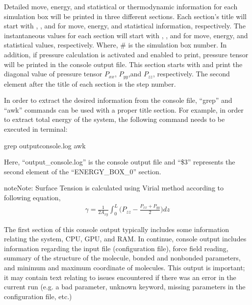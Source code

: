 \documentclass[letterpaper,10pt,english]{sphinxmanual}
\begin{document}
\sphinxAtStartPar
Detailed move, energy, and statistical or thermodynamic information for each simulation box will be printed in
three different sections. Each section’s title will start with , , and  for move,
energy, and statistical information, respectively. The instantaneous values for each section will start with
, , and  for move, energy, and statistical values, respectively. Where, \# is the
simulation box number. In addition, if pressure calculation is activated and enabled to print, pressure tensor
will be printed in the console output file. This section starts with  and print the diagonal value of
pressure tensor \(P_{xx}\), \(P_{yy}\),and \(P_{zz}\), respectively. The second element after the
title of each section is the step number.

\sphinxAtStartPar
In order to extract the desired information from the console file, “grep” and “awk” commands can be used with
a proper title section. For example, in order to extract total energy of the system, the following command needs
to be executed in terminal:

\begin{sphinxVerbatim}[commandchars=\\\{\}]
\PYGZdl{} grep  output\PYGZus{}console.log  awk 
\end{sphinxVerbatim}

\sphinxAtStartPar
Here, “output\_console.log” is the console output file and “\$3” represents the second element of the “ENERGY\_BOX\_0” section.

\begin{sphinxadmonition}{note}{Note:}
\sphinxAtStartPar
Surface Tension is calculated using Virial method according to following equation,
\begin{equation*}
\begin{split}\gamma = \frac{1}{2A_{xy}} \int_{0}^{L} \bigg(P_{zz} - \frac{P_{xx} + P_{yy}}{2} \bigg) dz\end{split}
\end{equation*}\end{sphinxadmonition}

\sphinxAtStartPar
The first section of this console output typically includes some information relating the system, CPU, GPU, and RAM. In continue, console output includes information regarding the input file (configuration file), force field reading, summary of the structure of the molecule, bonded and non\sphinxhyphen{}bonded parameters, and minimum and maximum coordinate of molecules. This output is important; it may contain text relating to issues encountered if there was an error in the current run (e.g. a bad parameter, unknown keyword, missing parameters in the configuration file, etc.)
\end{document}
